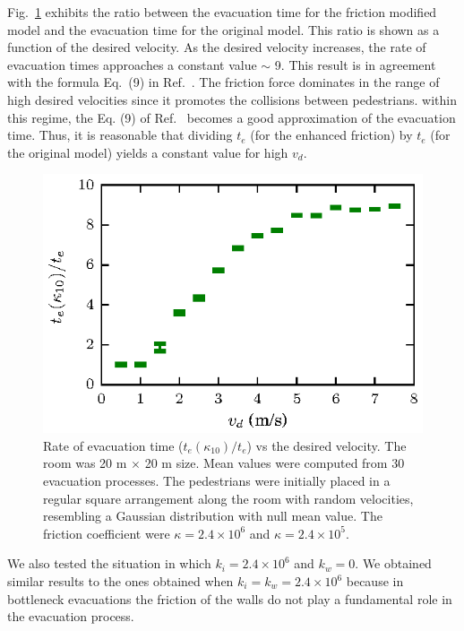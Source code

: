 \documentclass[preprint,12pt]{elsarticle}
\begin{document}
Fig.~\ref{rate_fis} exhibits the ratio between the evacuation time for the 
friction modified model and the evacuation time for the original model. This 
ratio is shown as a function of the desired velocity. As the desired velocity 
increases, the rate of evacuation times approaches a constant value $\sim$ 9. 
This result is in agreement with the formula Eq.~(9) in Ref.~\cite{sticco}. The 
friction force dominates in the range of high desired velocities since it 
promotes the collisions between pedestrians. within this regime, the Eq. (9) of  
Ref.~\cite{sticco} becomes a good approximation of the evacuation time. Thus, it 
is reasonable that dividing $t_e$ (for the enhanced friction) by $t_e$ (for the 
original model) yields a constant value for high $v_d$.  \\ 

\begin{figure}[htbp!]
\centering
\includegraphics[width=0.7\columnwidth]
{./fis_cociente.eps}
\caption{\label{rate_fis} Rate of evacuation time ($t_e(\kappa_{10})/t_e$) vs the desired velocity. The room was 20 m $\times$ 20 m size. Mean values were computed from 30 evacuation processes. The pedestrians were initially placed in a regular square arrangement along the room with random velocities, resembling a Gaussian distribution with null mean value. The friction coefficient were $\kappa=2.4\times10^{6}$ and $\kappa=2.4\times10^{5}$. }
\end{figure}

We also tested the situation in which $k_i=2.4\times 10^{6}$ and $k_w=0$. We obtained similar results to the ones obtained when $k_i=k_w=2.4\times 10^{6}$ because in bottleneck evacuations the friction of the walls do not play a fundamental role in the evacuation process. 

\end{document}
